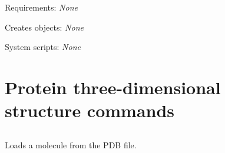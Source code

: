 \begin{description}
\begin{enumerate}
\end{enumerate}


\item{Requirements:} {\em None}


\item{Creates objects:} {\em None}


\item{System scripts:} {\em None}

\end{description}


\section{Protein three-dimensional structure commands}


\subsection[mol\_load]{  }



Loads a molecule from the PDB file.


